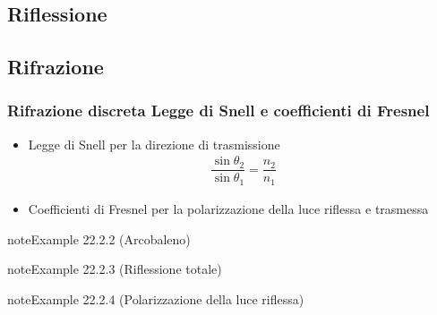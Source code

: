 \documentclass[letterpaper,10pt,italian]{jupyterBook}
\begin{document}
\subsection{Riflessione}
\label{\detokenize{ch/waves/optics-phenomena:riflessione}}

\subsection{Rifrazione}
\label{\detokenize{ch/waves/optics-phenomena:rifrazione}}

\subsubsection{Rifrazione discreta \sphinxhyphen{} Legge di Snell e coefficienti di Fresnel}
\label{\detokenize{ch/waves/optics-phenomena:rifrazione-discreta-legge-di-snell-e-coefficienti-di-fresnel}}\label{\detokenize{ch/waves/optics-phenomena:physics-hs-waves-optics-geometric-phenomena-snell}}\begin{itemize}
\item {} 
\sphinxAtStartPar
Legge di Snell per la direzione di trasmissione
\begin{equation*}
\begin{split} \dfrac{\sin \theta_2}{\sin \theta_1} = \dfrac{n_2}{n_1}\end{split}
\end{equation*}
\item {} 
\sphinxAtStartPar
Coefficienti di Fresnel per la polarizzazione della luce riflessa e trasmessa

\end{itemize}
\label{ch/waves/optics-phenomena:example-1}
\begin{sphinxadmonition}{note}{Example 22.2.2 (Arcobaleno)}


\end{sphinxadmonition}
\label{ch/waves/optics-phenomena:example-2}
\begin{sphinxadmonition}{note}{Example 22.2.3 (Riflessione totale)}


\end{sphinxadmonition}
\label{ch/waves/optics-phenomena:example-3}
\begin{sphinxadmonition}{note}{Example 22.2.4 (Polarizzazione della luce riflessa)}


\end{sphinxadmonition}
\end{document}
